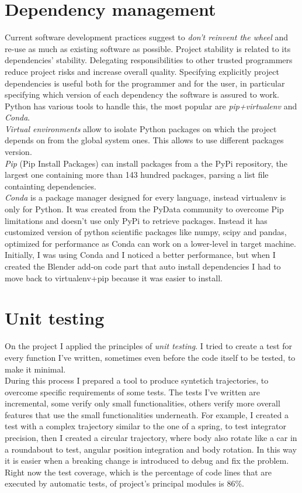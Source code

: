 \section{Dependency management}
Current software development practices suggest to \textit{don't reinvent the wheel} and re-use as much as existing software as possible.
Project stability is related to its dependencies' stability. Delegating responsibilities to other trusted programmers reduce project risks and increase overall quality. Specifying explicitly project dependencies is useful both for the programmer and for the user, in particular specifying which version of each dependency the software is assured to work. Python has various tools to handle this, the most popular are \textit{pip+virtualenv} and \textit{Conda}. \\
\textit{Virtual environments} allow to isolate Python packages on which the project depends on from the global system ones. This allows to use different packages version. \\
\textit{Pip} (Pip Install Packages) can install packages from a the PyPi repository, the largest one containing more than 143 hundred packages, parsing a list file containting dependencies. \\
\textit{Conda} is a package manager designed for every language, instead virtualenv is only for Python. It was created from the PyData community to overcome Pip limitations and doesn't use only PyPi to retrieve packages. Instead it has customized version of python scientific packages like numpy, scipy and pandas, optimized for performance as Conda can work on a lower-level in target machine. \\
Initially, I was using Conda and I noticed a better performance, but when I created the Blender add-on code part that auto install dependencies I had to move back to virtualenv+pip because it was easier to install.

\section{Unit testing}
On the project I applied the principles of \textit{unit testing}. I tried to create a test for every function I've written, sometimes even before the code itself to be tested, to make it minimal. \\
During this process I prepared a tool to produce syntetich trajectories, to overcome specific requirements of some tests.
The tests I've written are incremental, some verify only small functionalities, others verify more overall features that use the small functionalities underneath. For example, I created a test with a complex trajectory similar to the one of a spring, to test integrator precision, then I created a circular trajectory, where body also rotate like a car in a roundabout to test, angular position integration and body rotation.
In this way it is easier when a breaking change is introduced to debug and fix the problem.\\
Right now the test coverage, which is the percentage of code lines that are executed by automatic tests, of project's principal modules is 86\%. \\ 